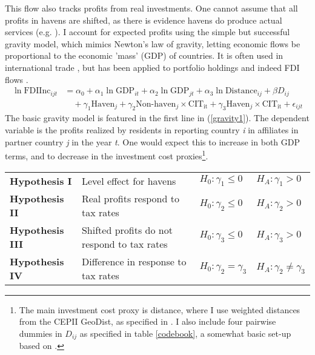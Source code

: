 \documentclass[twoside,a4paper,11pt]{article}
\begin{document}
This flow also tracks profits from real investments. One cannot assume that all profits in havens are shifted, as there is evidence havens do produce actual services (e.g. \textcite{hebous_at_2016}). I account for  expected profits using the simple but successful gravity model, which mimics Newton's law of gravity, letting economic flows be proportional to the economic 'mass' (GDP) of countries.  It is often used in international trade \autocite{shepherd_gravity_2012}, but has been applied to portfolio holdings \autocite{zucman_missing_2013} and indeed FDI flows  \autocite{blonigen_review_2005}. 
\begin{equation}\label{gravity1}
\begin{aligned}
\ln\text{FDIInc}_{ijt} &= \alpha_0 + \alpha_1\ln\text{GDP}_{it}+\alpha_2\ln\text{GDP}_{jt}+ \alpha_3\ln\text{Distance}_{ij}+\beta D_{ij} \\
&\quad + \gamma_1 \text{Haven}_j+\gamma_2\text{Non-haven}_j\times\text{CIT}_\text{it}  + \gamma_3 \text{Haven}_j\times \text{CIT}_\text{it}   + \epsilon_{ijt}
\end{aligned}
\end{equation}
The basic gravity model is featured in the first line in (\ref{gravity1}). The dependent variable is the profits realized by residents in reporting country \textit{i} in affiliates in partner country \textit{j} in the year \textit{t}. One would expect this to increase in both GDP terms, and to decrease in the investment cost proxies\footnote{The main investment cost proxy is distance, where I use weighted distances from the CEPII GeoDist, as specified in \textcite{mayer_notes_2011}. I also include four pairwise dummies in $ D_{ij} $ as specified in table \ref{codebook}, a somewhat basic set-up based on  \textcite[16]{shepherd_gravity_2012}.}.

\begin{table}
	\label{hypotheses}
		\begin{tabular}{llll} 
			\textbf{Hypothesis I} & Level effect for havens & $ H_0: \gamma_1 \le0 $ & $ H_A: \gamma_1 >0  $ \\
			\textbf{Hypothesis II} & Real profits respond to tax rates & $ H_0: \gamma_2 \le0 $ & $ H_A: \gamma_2 >0  $ \\
			\textbf{Hypothesis III} & Shifted profits do not respond to tax rates & $ H_0: \gamma_3 \le0 $ & $ H_A: \gamma_3 >0  $ \\
			\textbf{Hypothesis IV} & Difference in response to tax rates & $ H_0: \gamma_2=\gamma_3 $ & $ H_A: \gamma_2\ne\gamma_3 $ 
		\end{tabular}
\end{table}
\end{document}
